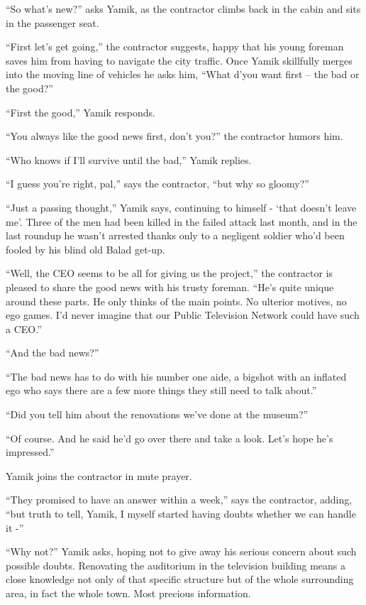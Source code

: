 \documentclass[twoside,11pt]{book}
\begin{document}
``So what's new?'' asks Yamik, as the contractor climbs back in the cabin and sits in the
passenger seat.

``First let's get going,'' the contractor suggests, happy that his young foreman saves him
from having to navigate the city traffic. Once Yamik skillfully merges into the moving line of vehicles he asks him,
``What d'you want first -- the bad or the good?''

``First the good,'' Yamik responds.

``You always like the good news first, don't you?'' the contractor humors him.

``Who knows if I'll survive until the bad,'' Yamik replies.

``I guess you're right, pal,'' says the contractor, ``but why so
gloomy?''

``Just a passing thought,'' Yamik says, continuing to himself - `that doesn't leave me'. Three
of the men had been killed in the failed attack last month, and in the last roundup he wasn't arrested thanks only to a
negligent soldier who'd been fooled by his blind old Balad get-up.

``Well, the CEO seems to be all for giving us the project,'' the contractor is pleased to
share the good news with his trusty foreman. ``He's quite unique around these parts. He only thinks of
the main points. No ulterior motives, no ego games. I'd never imagine that our Public Television Network could have
such a CEO.''

``And the bad news?''

``The bad news has to do with his number one aide, a bigshot with an inflated ego who says there are a few
more things they still need to talk about.''

``Did you tell him about the renovations we've done at the museum?''

``Of course. And he said he'd go over there and take a look. Let's hope he's impressed.''

Yamik joins the contractor in mute prayer.

``They promised to have an answer within a week,'' says the contractor,
adding, ``but truth to tell, Yamik, I myself started having doubts whether we can handle it
-''

``Why not?'' Yamik asks, hoping not to give away his serious concern about
such possible doubts. Renovating the auditorium in the television building means a close knowledge not only of that
specific structure but of the whole surrounding area, in fact the whole town. Most precious information.
\end{document}
